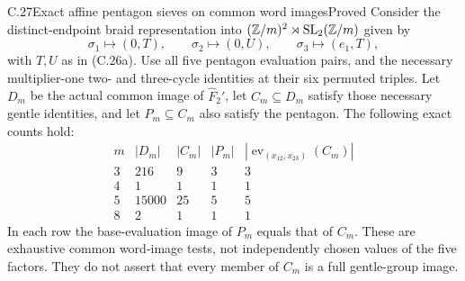 \begin{statement}{C.27}{Exact affine pentagon sieves on common word images}{Proved}
Consider the distinct-endpoint braid representation into
\((\mathbb Z/m)^2\rtimes{\rm SL}_2(\mathbb Z/m)\)
given by
\[
 \sigma_1\mapsto(0,T),\qquad
 \sigma_2\mapsto(0,U),\qquad
 \sigma_3\mapsto(e_1,T),
 \tag{C.27a}
\]
with \(T,U\) as in (C.26a). Use all five pentagon
evaluation pairs, and the necessary multiplier-one
two- and three-cycle identities at their six
permuted triples. Let \(D_m\) be the actual common
image of \(\widehat F_2'\), let \(C_m\subseteq D_m\)
satisfy those necessary gentle identities, and let
\(P_m\subseteq C_m\) also satisfy the pentagon.
The following exact counts hold:
\[
\begin{array}{c|r|r|r|r}
 m&|D_m|&|C_m|&|P_m|&
   |\operatorname{ev}_{(x_{12},x_{23})}(C_m)|\\\hline
 3&216&9&3&3\\
 4&1&1&1&1\\
 5&15000&25&5&5\\
 8&2&1&1&1
\end{array}
\tag{C.27b}
\]
In each row the base-evaluation image of \(P_m\)
equals that of \(C_m\). These are exhaustive common
word-image tests, not independently chosen values
of the five factors. They do not assert that every
member of \(C_m\) is a full gentle-group image.
\end{statement}

